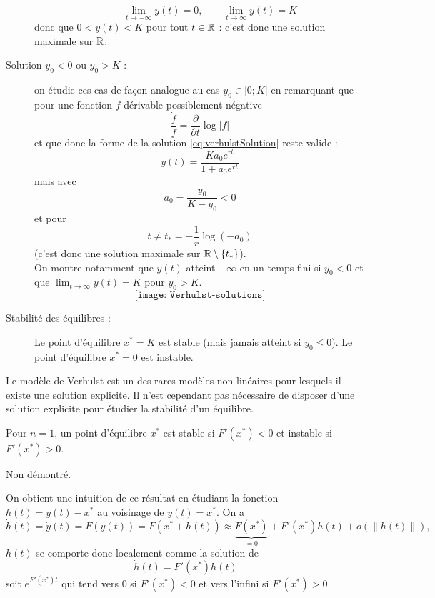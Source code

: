 \begin{description}
$$  \qquad 
  \lim_{t \rightarrow -\infty} y(t) = 0, 
  \qquad
  \lim_{t \rightarrow \infty} y(t) = K
  $$
  donc que $0 < y(t) < K$ pour tout $t \in \mathbb{R}$ : c'est donc une solution maximale sur $\mathbb{R}$. \\
  \item[Solution $y_0 < 0$ ou $y_0 > K$ :] on étudie ces cas de façon analogue au cas $y_0 \in ]0; K[$ en remarquant que pour une fonction $f$ dérivable possiblement négative 
  $$
  \frac{\dot f}{f} = \frac{\partial}{\partial t} \log |f|
  $$
  et que donc la forme de la solution \eqref{eq:verhulstSolution} reste valide : 
  $$
  y(t) = \frac{K a_ 0 e^{rt}}{1 +  a_0 e^{rt}}
  $$
  mais avec
  $$
  a_0 = \frac{y_0}{K-y_0} < 0
  $$ 
  et pour 
  $$
  t \neq t_* = -\frac1r \log(-a_0)
  $$
  (c'est donc une solution maximale sur $\mathbb{R} \setminus \left\{t_*\right\}$). \\
  On montre notamment que $y(t)$ atteint $- \infty$ en un temps fini si $y_0 < 0$ et que $\lim_{t \rightarrow \infty} y(t) = K$ pour $y_0 > K$.
  $$
  \texttt{[image: Verhulst-solutions]}
  $$
  \item[Stabilité des équilibres :]
  Le point d'équilibre $x^* = K$ est stable (mais jamais atteint si $y_0 \leq 0$). Le point d'équilibre $x^* = 0$ est instable.
\end{description}

\remark
Le modèle de Verhulst est un des rares modèles non-linéaires pour lesquels il existe une solution explicite. Il n'est cependant pas nécessaire de disposer d'une solution explicite pour étudier la stabilité d'un équilibre.

\begin{theorem}[Stabilité ($n = 1$)]
  Pour $n=1$, un point d'équilibre $x^*$ est stable si $F'(x^*) < 0$ et instable si $F'(x^*) > 0$.
\end{theorem}

\proof Non démontré. \eproof

\remark
On obtient une intuition de ce résultat en étudiant la fonction $h(t) = y(t) - x^*$ au voisinage de $y(t) = x^*$. On a
$$
\dot h(t) = \dot y(t) = F(y(t)) = F(x^* + h(t)) \approx \underset{=0}{\underbrace{F(x^*)}} + F'(x^*) h(t) + o(\|h(t)\|),
$$
$h(t)$ se comporte donc localement comme la solution de 
$$
\dot h(t) = F'(x^*) h(t)
$$
soit $e ^{F'(x^*) t}$ qui tend vers 0 si $F'(x^*) < 0$ et vers l'infini si $F'(x^*) > 0$.



